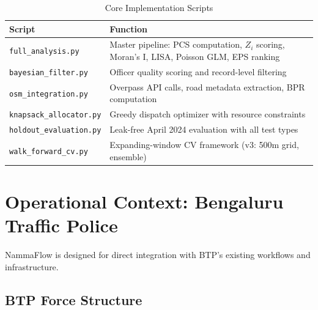 \documentclass[12pt,a4paper]{article}
\begin{document}
\begin{table}[H]
\centering
\caption{Core Implementation Scripts}
\begin{tabular}{p{5cm}p{8cm}}
\toprule
\textbf{Script} & \textbf{Function} \\
\midrule
\texttt{full\_analysis.py} & Master pipeline: PCS computation, $Z_i$ scoring, Moran's I, LISA, Poisson GLM, EPS ranking \\
\texttt{bayesian\_filter.py} & Officer quality scoring and record-level filtering \\
\texttt{osm\_integration.py} & Overpass API calls, road metadata extraction, BPR computation \\
\texttt{knapsack\_allocator.py} & Greedy dispatch optimizer with resource constraints \\
\texttt{holdout\_evaluation.py} & Leak-free April 2024 evaluation with all test types \\
\texttt{walk\_forward\_cv.py} & Expanding-window CV framework (v3: 500m grid, ensemble) \\
\bottomrule
\end{tabular}
\end{table}

\section{Operational Context: Bengaluru Traffic Police}

NammaFlow is designed for direct integration with BTP's existing workflows and infrastructure.

\subsection{BTP Force Structure}
\end{document}
